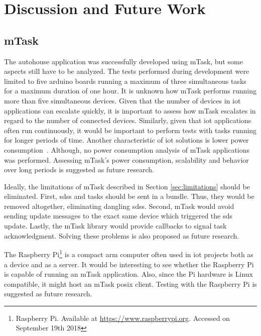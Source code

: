 \section{Discussion and Future Work}

\subsection{mTask}

The \gls{autohouse} application was successfully developed using \gls{mTask}, but some aspects still have to be analyzed. The tests performed during development were limited to five \gls{arduino} boards running a maximum of three simultaneous tasks for a maximum duration of one hour. It is unknown how \gls{mTask} performs running more than five simultaneous devices. Given that the number of devices in \acs{iot} applications can escalate quickly, it is important to assess how \gls{mTask} escalates in regard to the number of connected devices. Similarly, given that \acs{iot} applications often run continuously, it would be important to perform tests with tasks running for longer periods of time. Another characteristic of \acs{iot} solutions is lower power consumption~\cite{survey,survey2,survey3}. Although, no power consumption analysis of \gls{mTask} applications was performed. Assessing \gls{mTask}'s power consumption, scalability and behavior over long periods is suggested as future research. 

Ideally, the limitations of \gls{mTask} described in Section \ref{sec:limitations} should be eliminated. First, \acsp{sds} and tasks should be sent in a bundle. Thus, they would be removed altogether, eliminating dangling \acsp{sds}. Second, \gls{mTask} would avoid sending update messages to the exact same device which triggered the \acs{sds} update. Lastly, the \gls{mTask} library would provide callbacks to signal task acknowledgment. Solving these problems is also proposed as future research.

The Raspberry Pi\footnote{Raspberry Pi. Available at \url{https://www.raspberrypi.org}. Accessed on September 19th 2018} is a compact \acs{arm} computer often used in \acs{iot} projects both as a device and as a server. It would be interesting to see whether the Raspberry Pi is capable of running an \gls{mTask} application. Also, since the Pi hardware is Linux compatible, it might host an \gls{mTask} \acs{posix} client. Testing with the Raspberry Pi is suggested as future research.


